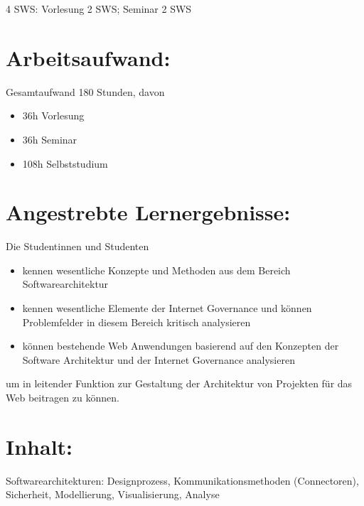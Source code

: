 4 SWS: Vorlesung 2 SWS; Seminar 2 SWS

\section*{Arbeitsaufwand:\label{/mi-2017/modulbeschreibungen-master/MA_WTW_Modul_Web-Architekturen}}\label{arbeitsaufwandpathlabelmi-2017modulbeschreibungen-mastermaux5fwtwux5fmodulux5fweb-architekturen}

Gesamtaufwand 180 Stunden, davon

\begin{itemize}
\tightlist
\item
  36h Vorlesung
\item
  36h Seminar
\item
  108h Selbststudium
\end{itemize}

\section*{Angestrebte
Lernergebnisse:\label{/mi-2017/modulbeschreibungen-master/MA_WTW_Modul_Web-Architekturen}}\label{angestrebte-lernergebnissepathlabelmi-2017modulbeschreibungen-mastermaux5fwtwux5fmodulux5fweb-architekturen}

Die Studentinnen und Studenten

\begin{itemize}
\tightlist
\item
  kennen wesentliche Konzepte und Methoden aus dem Bereich
  Softwarearchitektur
\item
  kennen wesentliche Elemente der Internet Governance und können
  Problemfelder in diesem Bereich kritisch analysieren
\item
  können bestehende Web Anwendungen basierend auf den Konzepten der
  Software Architektur und der Internet Governance analysieren
\end{itemize}

um in leitender Funktion zur Gestaltung der Architektur von Projekten
für das Web beitragen zu können.

\section*{Inhalt:\label{/mi-2017/modulbeschreibungen-master/MA_WTW_Modul_Web-Architekturen}}\label{inhaltpathlabelmi-2017modulbeschreibungen-mastermaux5fwtwux5fmodulux5fweb-architekturen}

Softwarearchitekturen: Designprozess, Kommunikationsmethoden
(Connectoren), Sicherheit, Modellierung, Visualisierung, Analyse

